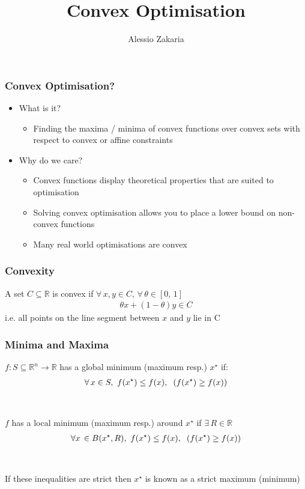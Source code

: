 \documentclass{beamer}
\title{Convex Optimisation}
\author{Alessio Zakaria}
\date{}
\def\rnum{\mathbb{R}}
\begin{document}
\begin{frame}
    \titlepage
\end{frame}

\begin{frame}
    \frametitle{Convex Optimisation?}
    \begin{itemize}
    \item What is it?
        \begin{itemize}
        \item Finding the maxima / minima of convex functions over convex sets
        with respect to convex or affine constraints
        \end{itemize}
    \item Why do we care?
        \begin{itemize}
            \item Convex functions display theoretical properties that are
                suited to optimisation
            \item Solving convex optimisation allows you to place a lower bound
                on non-convex functions
            \item Many real world optimisations are convex
        \end{itemize}
    \end{itemize}
\end{frame}
\begin{frame}
    \frametitle{Convexity}
    A set $C \subseteq \mathbb{R}$ is convex if $\forall \,  x,  y \in C, \,
    \forall \, \theta \in [0, \, 1]$
    \begin{align*}
        \theta x + (1-\theta)y \in C
    \end{align*}
    i.e. all points on the line segment between $x$ and $y$ lie in C
\end{frame}

\begin{frame}
    \frametitle{Minima and Maxima}
    $f: S \subseteq \rnum^{n} \rightarrow \rnum$ has a global minimum (maximum
    resp.) $x^{\star}$ if:
    \begin{align*}
        \forall \, x \in S, \, \, f(x^{\star}) \leq f(x), \hspace{2mm}  (f(x^{\star}) \geq f(x))
    \end{align*}
    \\~\\
    $f$ has a local minimum (maximum resp.) around $x^{\star}$ if $\exists \, R \in
     \rnum$ 
    \begin{align*}
        \forall x \, \in B(x^{\star}, R), \, \, f(x^{\star}) \leq f(x),
        \hspace{2mm} (f(x^{\star}) \geq f(x))
    \end{align*}
    \\~\\
    If these inequalities are strict then $x^{\star}$ is known as a strict
    maximum (minimum)
\end{frame}
\end{document}
